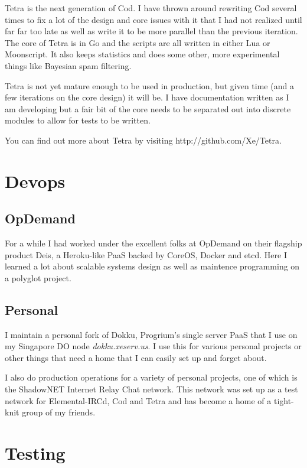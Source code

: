 \documentclass[twocolumn]{article}
\begin{document}
Tetra is the next generation of Cod. I have thrown around rewriting Cod several times to fix a lot of the design and core issues with it that I had not realized until far far too late as well as write it to be more parallel than the previous iteration. The core of Tetra is in Go and the scripts are all written in either Lua or Moonscript. It also keeps statistics and does some other, more experimental things like Bayesian spam filtering.

Tetra is not yet mature enough to be used in production, but given time (and a few iterations on the core design) it will be. I have documentation written as I am developing but a fair bit of the core needs to be separated out into discrete modules to allow for tests to be written.

You can find out more about Tetra by visiting http://github.com/Xe/Tetra.

\section{Devops}

\subsection{OpDemand}

For a while I had worked under the excellent folks at OpDemand on their flagship product Deis, a Heroku-like PaaS backed by CoreOS, Docker and etcd. Here I learned a lot about scalable systems design as well as maintence programming on a polyglot project.

\subsection{Personal}

I maintain a personal fork of Dokku, Progrium's single server PaaS that I use on my Singapore DO node \textit{dokku.xeserv.us}. I use this for various personal projects or other things that need a home that I can easily set up and forget about.

I also do production operations for a variety of personal projects, one of which is the ShadowNET Internet Relay Chat network. This network was set up as a test network for Elemental-IRCd, Cod and Tetra and has become a home of a tight-knit group of my friends.

\section{Testing}
\end{document}
